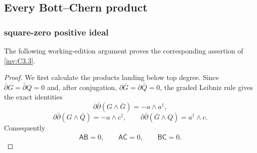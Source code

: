 \subsection{Every Bott--Chern product}

\subsubsection{square-zero positive ideal}\label{inv:wbproof:thm:bcpr-square-zero-algebra}
The following working-edition argument proves the corresponding assertion of \cref{inv:C3.3}.


\begin{proof}
We first calculate the products landing below top degree.  Since
$\bar\partial G=\bar\partial Q=0$ and, after conjugation,
$\partial\bar G=\partial\bar Q=0$, the graded Leibniz rule gives the exact
identities
\begin{equation}
 \partial\bar\partial(G\wedge\bar G)
 =-a\wedge a^\dagger,
\label{wb:eq:bcpr-product-ab}
\end{equation}
\begin{equation}
 \partial\bar\partial(G\wedge\bar Q)
 =-a\wedge c^\dagger,
 \qquad
 \partial\bar\partial(\bar G\wedge Q)
 =a^\dagger\wedge c.
\label{wb:eq:bcpr-product-acbar-bc}
\end{equation}
Consequently
\begin{equation}
 \mathsf A\mathsf B=0,\qquad
 \mathsf A\overline{\mathsf C}=0,\qquad
 \mathsf B\mathsf C=0.
\label{wb:eq:bcpr-first-zero-products}
\end{equation}


\end{proof}

